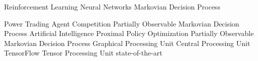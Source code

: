 \begin       {acronym}[Bash]
	         {Reinforcement Learning}
	         {Neural Networks}
	        {Markovian Decision Process}

	   {Power Trading Agent Competition} 
	      {Partially Observable Markovian Decision Process}
	         {Artificial Intelligence}
	        {Proximal Policy Optimization}
	      {Partially Observable Markovian Decision Process}
	        {Graphical Processing Unit}
	        {Central Processing Unit}
	         {TensorFlow}
	        {Tensor Processing Unit}
	       {state-of-the-art}
\end       {acronym}
